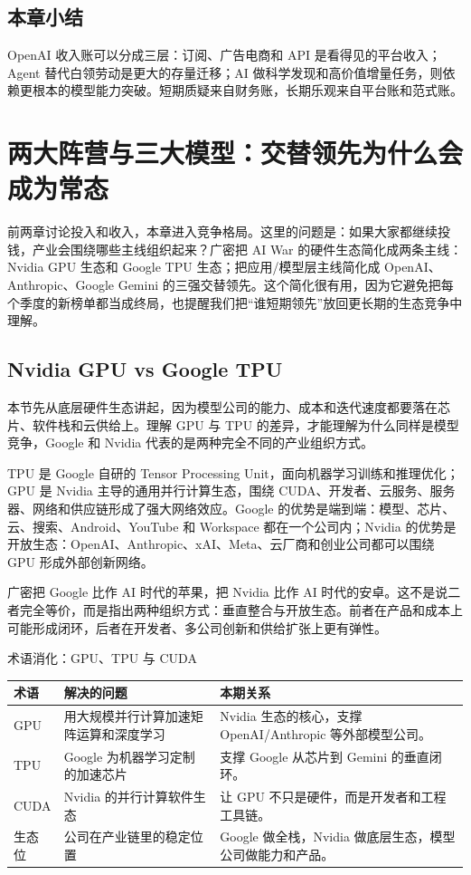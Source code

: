 \documentclass[a4paper]{article}
\begin{document}
\subsection{本章小结}

OpenAI 收入账可以分成三层：订阅、广告电商和 API 是看得见的平台收入；Agent 替代白领劳动是更大的存量迁移；AI 做科学发现和高价值增量任务，则依赖更根本的模型能力突破。短期质疑来自财务账，长期乐观来自平台账和范式账。

\section{两大阵营与三大模型：交替领先为什么会成为常态}

前两章讨论投入和收入，本章进入竞争格局。这里的问题是：如果大家都继续投钱，产业会围绕哪些主线组织起来？广密把 AI War 的硬件生态简化成两条主线：Nvidia GPU 生态和 Google TPU 生态；把应用/模型层主线简化成 OpenAI、Anthropic、Google Gemini 的三强交替领先。这个简化很有用，因为它避免把每个季度的新榜单都当成终局，也提醒我们把“谁短期领先”放回更长期的生态竞争中理解。

\subsection{Nvidia GPU vs Google TPU}

本节先从底层硬件生态讲起，因为模型公司的能力、成本和迭代速度都要落在芯片、软件栈和云供给上。理解 GPU 与 TPU 的差异，才能理解为什么同样是模型竞争，Google 和 Nvidia 代表的是两种完全不同的产业组织方式。

TPU 是 Google 自研的 Tensor Processing Unit，面向机器学习训练和推理优化；GPU 是 Nvidia 主导的通用并行计算生态，围绕 CUDA、开发者、云服务、服务器、网络和供应链形成了强大网络效应。Google 的优势是端到端：模型、芯片、云、搜索、Android、YouTube 和 Workspace 都在一个公司内；Nvidia 的优势是开放生态：OpenAI、Anthropic、xAI、Meta、云厂商和创业公司都可以围绕 GPU 形成外部创新网络。

广密把 Google 比作 AI 时代的苹果，把 Nvidia 比作 AI 时代的安卓。这不是说二者完全等价，而是指出两种组织方式：垂直整合与开放生态。前者在产品和成本上可能形成闭环，后者在开发者、多公司创新和供给扩张上更有弹性。

\begin{knowledgebox}{术语消化：GPU、TPU 与 CUDA}
\begin{tabularx}{\textwidth}{p{}p{}X}
\toprule
术语 & 解决的问题 & 本期关系 \\
\midrule
GPU & 用大规模并行计算加速矩阵运算和深度学习 & Nvidia 生态的核心，支撑 OpenAI/Anthropic 等外部模型公司。 \\
TPU & Google 为机器学习定制的加速芯片 & 支撑 Google 从芯片到 Gemini 的垂直闭环。 \\
CUDA & Nvidia 的并行计算软件生态 & 让 GPU 不只是硬件，而是开发者和工程工具链。 \\
生态位 & 公司在产业链里的稳定位置 & Google 做全栈，Nvidia 做底层生态，模型公司做能力和产品。 \\
\bottomrule
\end{tabularx}
\end{knowledgebox}
\end{document}
